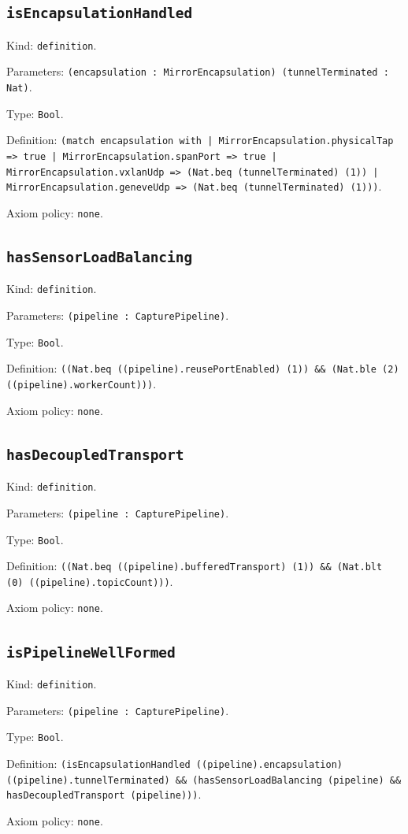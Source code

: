 \documentclass[11pt]{article}
\begin{document}
\subsection*{\texttt{isEncapsulationHandled}}
\noindent Kind: \texttt{definition}.\par
\noindent Parameters: \texttt{(encapsulation : MirrorEncapsulation) (tunnelTerminated : Nat)}.\par
\noindent Type: \texttt{Bool}.\par
\noindent Definition: \texttt{(match encapsulation with | MirrorEncapsulation.physicalTap => true | MirrorEncapsulation.spanPort => true | MirrorEncapsulation.vxlanUdp => (Nat.beq (tunnelTerminated) (1)) | MirrorEncapsulation.geneveUdp => (Nat.beq (tunnelTerminated) (1)))}.\par
\noindent Axiom policy: \texttt{none}.\par
\subsection*{\texttt{hasSensorLoadBalancing}}
\noindent Kind: \texttt{definition}.\par
\noindent Parameters: \texttt{(pipeline : CapturePipeline)}.\par
\noindent Type: \texttt{Bool}.\par
\noindent Definition: \texttt{((Nat.beq ((pipeline).reusePortEnabled) (1)) \&\& (Nat.ble (2) ((pipeline).workerCount)))}.\par
\noindent Axiom policy: \texttt{none}.\par
\subsection*{\texttt{hasDecoupledTransport}}
\noindent Kind: \texttt{definition}.\par
\noindent Parameters: \texttt{(pipeline : CapturePipeline)}.\par
\noindent Type: \texttt{Bool}.\par
\noindent Definition: \texttt{((Nat.beq ((pipeline).bufferedTransport) (1)) \&\& (Nat.blt (0) ((pipeline).topicCount)))}.\par
\noindent Axiom policy: \texttt{none}.\par
\subsection*{\texttt{isPipelineWellFormed}}
\noindent Kind: \texttt{definition}.\par
\noindent Parameters: \texttt{(pipeline : CapturePipeline)}.\par
\noindent Type: \texttt{Bool}.\par
\noindent Definition: \texttt{(isEncapsulationHandled ((pipeline).encapsulation) ((pipeline).tunnelTerminated) \&\& (hasSensorLoadBalancing (pipeline) \&\& hasDecoupledTransport (pipeline)))}.\par
\noindent Axiom policy: \texttt{none}.\par
\end{document}
